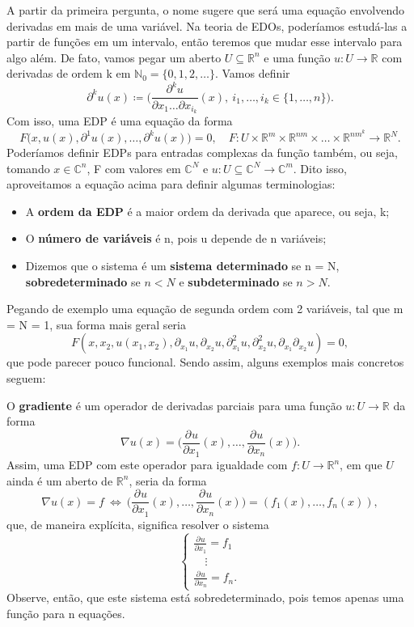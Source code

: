 \documentclass[../pde_notes.tex]{subfiles}
\begin{document}
A partir da primeira pergunta, o nome sugere que será uma equação envolvendo derivadas em mais de uma variável. Na teoria de EDOs, poderíamos estudá-las a partir de funções em um intervalo, então teremos que mudar esse intervalo para algo além. De fato, vamos pegar um aberto \(U\subseteq \mathbb{R}^{n}\) e uma função \(u:U\rightarrow \mathbb{R}\) com derivadas de ordem k em \(\mathbb{N}_{0} = \{0, 1, 2, \dotsc \}\). Vamos definir
\[
	\partial^{k}u(x)\coloneqq \biggl(\frac{\partial^{k}u}{\partial x_{1}\dotsc \partial x_{i_{k}}}(x),\: i_{1},\dotsc ,i_{k}\in \{1, \dotsc , n\}\biggr).
\]
Com isso, uma EDP é uma equação da forma
\[
	F \biggl(x, u(x), \partial^{1}u(x), \dotsc , \partial^{k}u(x)\biggr) = 0,\quad F:U\times \mathbb{R}^{m}\times \mathbb{R}^{nm}\times \dotsc \times \mathbb{R}^{nm^{k}}\rightarrow \mathbb{R}^{N}.
\]
Poderíamos definir EDPs para entradas complexas da função também, ou seja, tomando \(x\in \mathbb{C}^{n}\), F com valores em \(\mathbb{C}^{N}\) e \(u:U\subseteq \mathbb{C}^{N}\rightarrow \mathbb{C}^{m}\). Dito isso, aproveitamos a equação acima para definir algumas terminologias:
\begin{itemize}
	\item A \textbf{ordem da EDP} é a maior ordem da derivada que aparece, ou seja, k;
	\item O \textbf{número de variáveis} é n, pois u depende de n variáveis;
	\item Dizemos que o sistema é um \textbf{sistema determinado} se n = N, \textbf{sobredeterminado} se \(n < N\) e \textbf{subdeterminado} se \(n > N\).
\end{itemize}
Pegando de exemplo uma equação de segunda ordem com 2 variáveis, tal que m = N = 1, sua forma mais geral seria
\[
	F(x, x_{2}, u(x_1, x_2), \partial^{}_{x_{1}}u, \partial^{}_{x_{2}}u, \partial^{2}_{x_{1}}u, \partial^{2}_{x_{2}}u, \partial^{}_{x_{1}}\partial^{}_{x_{2}}u) = 0,
\]
que pode parecer pouco funcional. Sendo assim, alguns exemplos mais concretos seguem:
\begin{example}
	O \textbf{gradiente} é um operador de derivadas parciais para uma função \(u:U\rightarrow \mathbb{R}\) da forma
	\[
		\nabla{u(x)} = \biggl(\frac{\partial^{}u}{\partial x_{1}^{}}(x), \dotsc , \frac{\partial^{}u}{\partial x_{n}^{}}(x)\biggr).
	\]
	Assim, uma EDP com este operador para igualdade com \(f:U\rightarrow \mathbb{R}^{n}\), em que \(U\) ainda é um aberto de \(\mathbb{R}^{n}\), seria da forma
	\[
		\nabla{u(x)} = f \: \Longleftrightarrow \: \biggl(\frac{\partial^{}u}{\partial x_{1}^{}}(x), \dotsc , \frac{\partial^{}u}{\partial x_{n}^{}}(x)\biggr) = (f_{1}(x), \dotsc , f_{n}(x)),
	\]
	que, de maneira explícita, significa resolver o sistema
	\[
		\left\{\begin{array}{ll}
			\frac{\partial^{}u}{\partial x_{1}^{}} = f_{1} \\
			\quad \vdots                                   \\
			\frac{\partial^{}u}{\partial x_{n}^{}} = f_{n}.
		\end{array}\right.
	\]
	Observe, então, que este sistema está sobredeterminado, pois temos apenas uma função para n equações.
\end{example}
\end{document}
